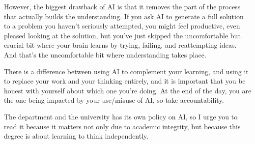 However, the biggest drawback of AI is that it removes the part of the process that actually builds the understanding. If you ask AI to generate a full solution to a problem you haven't seriously attempted, you might feel productive, even pleased looking at the solution, but you've just skipped the uncomfortable but crucial bit where your brain learns by trying, failing, and reattempting ideas. And that's the uncomfortable bit where understanding takes place. 

There is a difference between using AI to complement your learning, and using it to replace your work and your thinking entirely, and it is important that you be honest with yourself about which one you're doing. At the end of the day, you are the one being impacted by your use/misuse of AI, so take accountability. 

The department and the university has its own policy on AI, so I urge you to read it because it matters not only due to academic integrity, but because this degree is about learning to think independently. 





